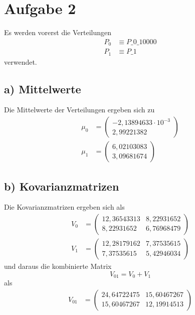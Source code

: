 \section{Aufgabe 2}
\label{sec:Aufgabe2}
Es werden vorerst die Verteilungen
\begin{align}
    P_0&\equiv P\_0\_10000\\
    P_1&\equiv P\_1
\end{align}
verwendet.
\subsection*{a) Mittelwerte}
Die Mittelwerte der Verteilungen ergeben sich zu
\begin{align}
    \mu_0&=\left(\begin{array}{c}-2,13894633\cdot10^{-3}\\2,99221382\end{array}\right)\\
    \mu_1&=\left(\begin{array}{c}6,02103083\\3,09681674\end{array}\right)
\end{align}
\subsection*{b) Kovarianzmatrizen}
Die Kovarianzmatrizen ergeben sich als
\begin{align}
    V_0&=\left(\begin{array}{cc}
        12,36543313 & 8,22931652\\
        8,22931652  & 6,76968479
    \end{array}\right)\\
    V_1&=\left(\begin{array}{cc}
        12,28179162 & 7,37535615\\
        7,37535615  & 5,42946034
    \end{array}\right)
\end{align}
und daraus die kombinierte Matrix
\begin{equation}
    V_{01}=V_0+V_1
\end{equation}
als
\begin{align}
    V_{01}&=\left(\begin{array}{cc}
        24,64722475 & 15,60467267\\
        15,60467267 & 12,19914513
    \end{array}\right)
\end{align}
